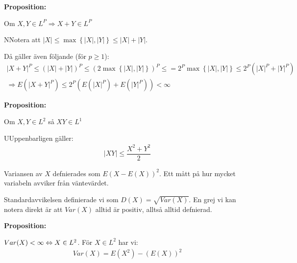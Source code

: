 \newpage
\noindent\textbf{Proposition:}\par
\noindent Om $X,Y\in L^P\Rightarrow X+Y\in L^P$
\par\bigskip
\begin{prf}
  NNotera att $\left|X\right|\leq \max\left\{\left|X\right|,\left|Y\right|\right\}\leq\left|X\right|+\left|Y\right|$.\par
  \noindent Då gäller även följande (för $p\geq1$):
  \begin{equation*}
    \begin{gathered}
    \left|X+Y\right|^P\leq (\left|X\right|+\left|Y\right|)^P\leq \left(2\max\left\{\left|X\right|,\left|Y\right|\right\}\right)^P\leq = 2^P\max\left\{\left|X\right|,\left|Y\right|\right\}\leq 2^P\left(\left|X\right|^P+\left|Y\right|^P\right)\\
    \Rightarrow E(\left|X+Y\right|^P)\leq 2^P(E(\left|X\right|^P)+E(\left|Y\right|^P))<\infty
    \end{gathered}
  \end{equation*}
\end{prf}
\par\bigskip
\noindent\textbf{Proposition:}\par
\noindent Om $X,Y\in L^2$ så $XY\in L^1$
\par\bigskip
\begin{prf}
  UUppenbarligen gäller:
  \begin{equation*}
    \begin{gathered}
      \left|XY\right|\leq\dfrac{X^2+Y^2}{2}
    \end{gathered}
  \end{equation*}
\end{prf}
\par\bigskip
\noindent Variansen av $X$ defnierades som $E(X-E(X))^2$. Ett mått på hur mycket variabeln avviker från väntevärdet.\par
\noindent Standardavvikelsen definierade vi som $D(X) = \sqrt{Var(X)}$. En grej vi kan notera direkt är att $Var(X)$ alltid är positiv, alltså alltid defnierad.
\par\bigskip
\noindent\textbf{Proposition:}\par
\noindent $Var(X)<\infty\Leftrightarrow X\in L^2$. För $X\in L^2$ har vi:
\begin{equation*}
  \begin{gathered}
    Var(X) = E(X^2)-(E(X))^2
  \end{gathered}
\end{equation*}
\par\bigskip

